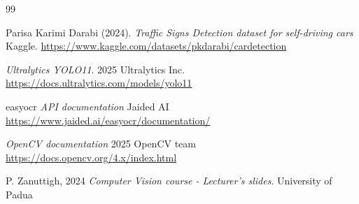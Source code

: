 \documentclass[10pt,conference,a4paper]{IEEEtran}
\begin{document}
\begin{thebibliography}{99}

 Parisa Karimi Darabi (2024). \textit{Traffic Signs Detection dataset for self-driving cars} Kaggle. \url{https://www.kaggle.com/datasets/pkdarabi/cardetection}

\textit{Ultralytics YOLO11}. 2025 Ultralytics Inc. \url{https://docs.ultralytics.com/models/yolo11}

easyocr\textit{ API documentation} Jaided AI \url{https://www.jaided.ai/easyocr/documentation/}

\textit{OpenCV documentation}  2025 OpenCV team \url{https://docs.opencv.org/4.x/index.html}

P. Zanuttigh, 2024 \textit{Computer Vision course - Lecturer's slides}. University of Padua

\end{thebibliography}
\clearpage
\end{document}
